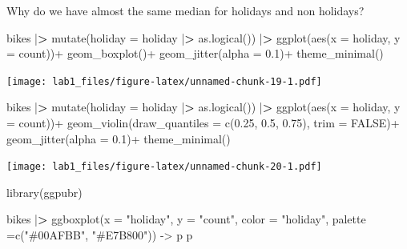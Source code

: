 \documentclass[
]{article}
\newenvironment{Shaded}{\begin{snugshade}}{\end{snugshade}}
\newcommand{\AttributeTok}[1]{\textcolor[rgb]{0.77,0.63,0.00}{#1}}
\newcommand{\ConstantTok}[1]{\textcolor[rgb]{0.00,0.00,0.00}{#1}}
\newcommand{\ErrorTok}[1]{\textcolor[rgb]{0.64,0.00,0.00}{\textbf{#1}}}
\newcommand{\FloatTok}[1]{\textcolor[rgb]{0.00,0.00,0.81}{#1}}
\newcommand{\FunctionTok}[1]{\textcolor[rgb]{0.00,0.00,0.00}{#1}}
\newcommand{\NormalTok}[1]{#1}
\newcommand{\OtherTok}[1]{\textcolor[rgb]{0.56,0.35,0.01}{#1}}
\newcommand{\SpecialCharTok}[1]{\textcolor[rgb]{0.00,0.00,0.00}{#1}}
\newcommand{\StringTok}[1]{\textcolor[rgb]{0.31,0.60,0.02}{#1}}
\begin{document}
Why do we have almost the same median for holidays and non holidays?

\begin{Shaded}
\begin{Highlighting}[]
\NormalTok{bikes }\SpecialCharTok{|}\ErrorTok{\textgreater{}} 
  \FunctionTok{mutate}\NormalTok{(}\AttributeTok{holiday =}\NormalTok{ holiday }\SpecialCharTok{|}\ErrorTok{\textgreater{}} \FunctionTok{as.logical}\NormalTok{()) }\SpecialCharTok{|}\ErrorTok{\textgreater{}} 
    \FunctionTok{ggplot}\NormalTok{(}\FunctionTok{aes}\NormalTok{(}\AttributeTok{x =}\NormalTok{ holiday, }\AttributeTok{y =}\NormalTok{ count))}\SpecialCharTok{+}
    \FunctionTok{geom\_boxplot}\NormalTok{()}\SpecialCharTok{+}
    \FunctionTok{geom\_jitter}\NormalTok{(}\AttributeTok{alpha =} \FloatTok{0.1}\NormalTok{)}\SpecialCharTok{+}
    \FunctionTok{theme\_minimal}\NormalTok{()}
\end{Highlighting}
\end{Shaded}

\texttt{[image: lab1\_files/figure-latex/unnamed-chunk-19-1.pdf]}

\begin{Shaded}
\begin{Highlighting}[]
\NormalTok{bikes }\SpecialCharTok{|}\ErrorTok{\textgreater{}} 
  \FunctionTok{mutate}\NormalTok{(}\AttributeTok{holiday =}\NormalTok{ holiday }\SpecialCharTok{|}\ErrorTok{\textgreater{}} \FunctionTok{as.logical}\NormalTok{()) }\SpecialCharTok{|}\ErrorTok{\textgreater{}} 
    \FunctionTok{ggplot}\NormalTok{(}\FunctionTok{aes}\NormalTok{(}\AttributeTok{x =}\NormalTok{ holiday, }\AttributeTok{y =}\NormalTok{ count))}\SpecialCharTok{+}
    \FunctionTok{geom\_violin}\NormalTok{(}\AttributeTok{draw\_quantiles =} \FunctionTok{c}\NormalTok{(}\FloatTok{0.25}\NormalTok{, }\FloatTok{0.5}\NormalTok{, }\FloatTok{0.75}\NormalTok{), }\AttributeTok{trim =} \ConstantTok{FALSE}\NormalTok{)}\SpecialCharTok{+}
    \FunctionTok{geom\_jitter}\NormalTok{(}\AttributeTok{alpha =} \FloatTok{0.1}\NormalTok{)}\SpecialCharTok{+}
    \FunctionTok{theme\_minimal}\NormalTok{()}
\end{Highlighting}
\end{Shaded}

\texttt{[image: lab1\_files/figure-latex/unnamed-chunk-20-1.pdf]}

\begin{Shaded}
\begin{Highlighting}[]
\FunctionTok{library}\NormalTok{(ggpubr)}

\NormalTok{bikes }\SpecialCharTok{|}\ErrorTok{\textgreater{}} 
  \FunctionTok{ggboxplot}\NormalTok{(}\AttributeTok{x =} \StringTok{"holiday"}\NormalTok{, }\AttributeTok{y =} \StringTok{"count"}\NormalTok{,}
            \AttributeTok{color =} \StringTok{"holiday"}\NormalTok{, }\AttributeTok{palette =}\FunctionTok{c}\NormalTok{(}\StringTok{"\#00AFBB"}\NormalTok{, }\StringTok{"\#E7B800"}\NormalTok{)) }\OtherTok{{-}\textgreater{}}\NormalTok{ p}
\NormalTok{p}
\end{Highlighting}
\end{Shaded}
\end{document}
